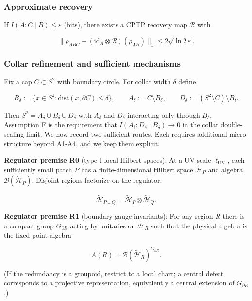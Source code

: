 \documentclass[11pt,a4paper]{article}
\theoremstyle{remark}
\begin{document}
\subsubsection{Approximate recovery}\label{approximate-recovery}

If \(I(A:C \mid B) \le \varepsilon\) (bits), there exists a CPTP recovery map \(\mathcal{R}\) with

\[
\| \rho_{ABC} - (\mathrm{id}_A \otimes \mathcal R)(\rho_{AB}) \|_1
\le 2 \sqrt{\ln 2\, \varepsilon}.
\]

\subsubsection{Collar refinement and sufficient mechanisms}\label{collar-refinement-and-sufficient-mechanisms}

Fix a cap \(C \subset S^2\) with boundary circle. For collar width \(\delta\) define

\[
B_\delta := \{x \in S^2 : \mathrm{dist}(x,\partial C) \le \delta\},
\qquad
A_\delta := C \setminus B_\delta,
\qquad
D_\delta := (S^2 \setminus C) \setminus B_\delta.
\]

Then \(S^2 = A_\delta \cup B_\delta \cup D_\delta\) with \(A_\delta\) and \(D_\delta\)
interacting only through \(B_\delta\). Assumption F is the requirement that
\(I(A_\delta:D_\delta \mid B_\delta) \to 0\) in the collar double-scaling limit. We now
record two sufficient routes. Each requires additional micro-structure beyond
A1-A4, and we keep them explicit.

\textbf{Regulator premise R0} (type-I local Hilbert spaces): At a UV scale \(\ell_{\mathrm{UV}}\), each
sufficiently small patch \(P\) has a finite-dimensional Hilbert space
\(\tilde{\mathcal H}_P\) and algebra \(\mathcal B(\tilde{\mathcal H}_P)\). Disjoint
regions factorize on the regulator:

\[
\tilde{\mathcal H}_{P \sqcup Q} = \tilde{\mathcal H}_P \otimes \tilde{\mathcal H}_Q.
\]

\textbf{Regulator premise R1} (boundary gauge invariants): For any region \(R\) there is a
compact group \(G_{\partial R}\) acting by unitaries on \(\tilde{\mathcal H}_R\) such
that the physical algebra is the fixed-point algebra

\[
A(R) = \mathcal B(\tilde{\mathcal H}_R)^{G_{\partial R}}.
\]

(If the redundancy is a groupoid, restrict to a local chart; a central defect
corresponds to a projective representation, equivalently a central extension
of \(G_{\partial R}\).)
\end{document}
